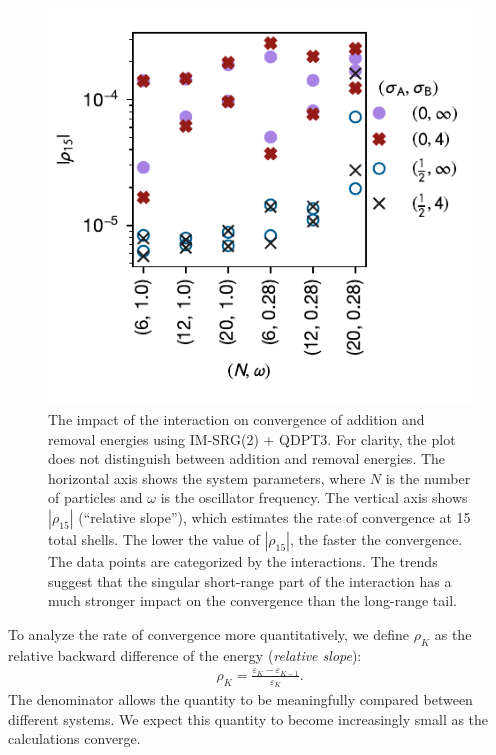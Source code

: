 \begin{figure}
  \centering \includegraphics{fig-rel-slopes2.pdf} \caption{The impact
  of the interaction on convergence of addition and removal energies
  using IM-SRG(2) + QDPT3.  For clarity, the plot does not distinguish
  between addition and removal energies.  The horizontal axis shows
  the system parameters, where $N$ is the number of particles and
  $\omega$ is the oscillator frequency.  The vertical axis shows
  $|\rho_{15}|$ (``relative slope''), which estimates the rate of
  convergence at 15 total shells.  The lower the value of
  $|\rho_{15}|$, the faster the convergence.  The data points are
  categorized by the interactions.  The trends suggest that the
  singular short-range part of the interaction has a much stronger
  impact on the convergence than the long-range
  tail.}  \label{fig:rel-slopes}
\end{figure}

To analyze the rate of convergence more quantitatively, we 
define $\rho_K$ as the relative backward difference of the energy
(\textit{relative slope}):
\begin{align*}
  \rho_K = \frac{\varepsilon_{K} - \varepsilon_{K - 1}}{\varepsilon_K}.
\end{align*}
The denominator allows the quantity to be meaningfully compared
between different systems.  We expect this quantity to become
increasingly small as the calculations converge.

